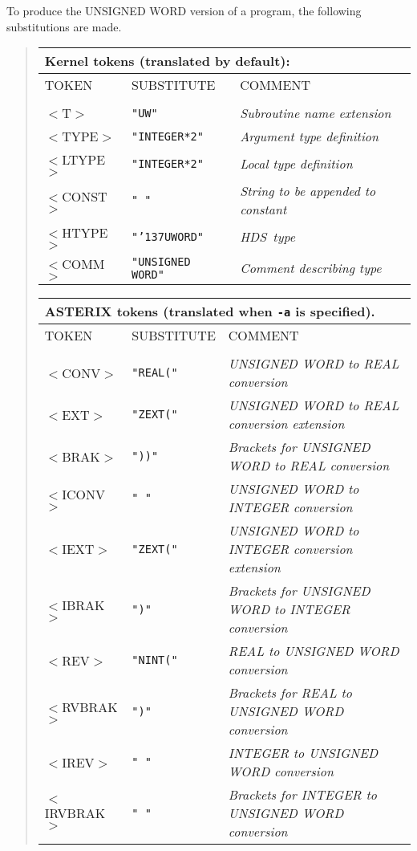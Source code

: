 \documentclass[twoside,11pt]{article}
\renewcommand{\_}{{\tt\char'137}}     %
\newcommand{\HDS}{{\footnotesize HDS}\normalsize}
\begin{document}
To produce the UNSIGNED WORD version of a program, the following
substitutions are made.
\begin{quote}
\begin{tabular}{lll}
\multicolumn{3}{l}{\bf{Kernel} tokens (translated by default):}\\
\hline
TOKEN      &SUBSTITUTE     &COMMENT\\
\\
$<$T$>$     &{\tt "UW"}            &{\em Subroutine name extension}\\
$<$TYPE$>$  &{\tt "INTEGER*2"}     &{\em Argument type definition}\\
$<$LTYPE$>$ &{\tt "INTEGER*2"}     &{\em Local type definition}\\
$<$CONST$>$ &{\tt " "}         &{\em String to be appended to constant}\\
$<$HTYPE$>$ &{\tt "\_UWORD"}       &{\em \HDS\ type}\\
$<$COMM$>$  &{\tt "UNSIGNED WORD"} &{\em Comment describing type}\\
\end{tabular}

\begin{tabular}{lll}
\multicolumn{3}{l}{\bf{ASTERIX} tokens (translated when {\tt -a} is specified).}\\
\hline
TOKEN      &SUBSTITUTE      &COMMENT\\
\\
$<$CONV$>$     &{\tt "REAL("} &{\em UNSIGNED WORD to REAL conversion}\\
$<$EXT$>$      &{\tt "ZEXT("} &{\em UNSIGNED WORD to REAL conversion extension}\\
$<$BRAK$>$     &{\tt "))"}    &{\em Brackets for UNSIGNED WORD to REAL conversion}\\
$<$ICONV$>$    &{\tt " "}     &{\em UNSIGNED WORD to INTEGER conversion}\\
$<$IEXT$>$     &{\tt "ZEXT("} &{\em UNSIGNED WORD to INTEGER conversion extension}\\
$<$IBRAK$>$    &{\tt ")"}     &{\em Brackets for UNSIGNED WORD to INTEGER conversion}\\
$<$REV$>$      &{\tt "NINT("} &{\em REAL to UNSIGNED WORD conversion}\\
$<$RVBRAK$>$   &{\tt ")"}     &{\em Brackets for REAL to UNSIGNED WORD conversion}\\
$<$IREV$>$     &{\tt " "}     &{\em INTEGER to UNSIGNED WORD conversion}\\
$<$IRVBRAK$>$  &{\tt " "}     &{\em Brackets for INTEGER to UNSIGNED WORD conversion}\\
\end{tabular}
\end{quote}
\end{document}
